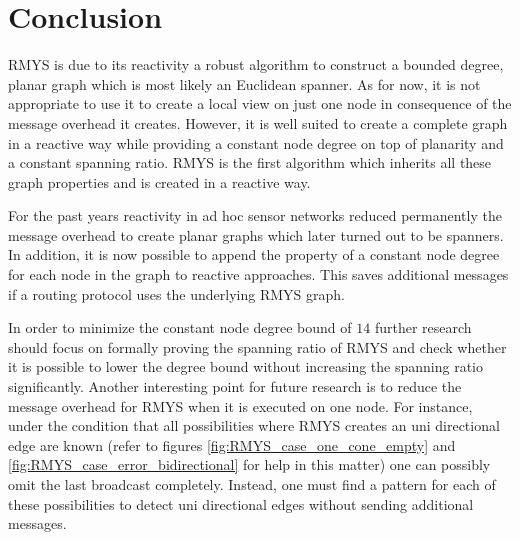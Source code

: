 \section{Conclusion}
RMYS is due to its reactivity a robust algorithm to construct a bounded degree, planar graph which is most likely an Euclidean spanner.
As for now, it is not appropriate to use it to create a local view on just one node in consequence of the message overhead it creates.
However, it is well suited to create a complete graph in a reactive way while providing a constant node degree on top of planarity and a constant spanning ratio.
RMYS is the first algorithm which inherits all these graph properties and is created in a reactive way.

For the past years reactivity in ad hoc sensor networks reduced permanently the message overhead to create planar graphs which later turned out to be spanners.
In addition, it is now possible to append the property of a constant node degree for each node in the graph to reactive approaches.
This saves additional messages if a routing protocol uses the underlying RMYS graph.

In order to minimize the constant node degree bound of $14 $ further research should focus on formally proving the spanning ratio of RMYS and check whether it is possible to lower the degree bound without increasing the spanning ratio significantly.
Another interesting point for future research is to reduce the message overhead for RMYS when it is executed on one node.
For instance, under the condition that all possibilities where RMYS creates an uni directional edge are known (refer to figures \ref{fig:RMYS_case_one_cone_empty} and \ref{fig:RMYS_case_error_bidirectional} for help in this matter) one can possibly omit the last broadcast completely.
Instead, one must find a pattern for each of these possibilities to detect uni directional edges without sending additional messages.